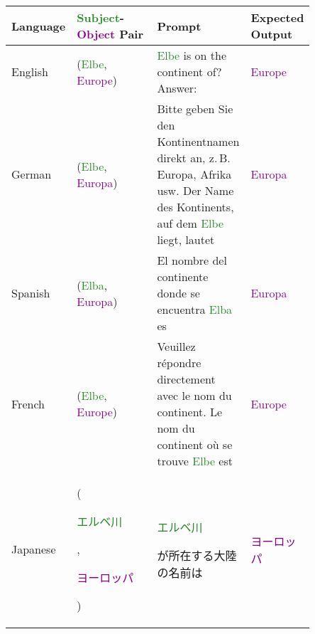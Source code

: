 \begin{table*}[htbp]
\scriptsize
\centering
\setlength{\tabcolsep}{1.0mm}{}
\begin{center}
\begin{tabular}{m{0.10\linewidth} p{0.30\linewidth} p{0.30\linewidth} m{0.15\linewidth}}
\textbf{Language} & \textbf{\textcolor{forestgreen}{Subject}-\textcolor{darkmagenta}{Object} Pair} & \textbf{Prompt} & \textbf{Expected Output} \\
\toprule
{\centering English} 
    & {\raggedright (\textcolor{forestgreen}{Elbe}, \textcolor{darkmagenta}{Europe})}
    & \textcolor{forestgreen}{Elbe} is on the continent of? \newline Answer:
    & {\centering \textcolor{darkmagenta}{Europe}} \\
\midrule
{\centering German} 
    & {\raggedright (\textcolor{forestgreen}{Elbe}, \textcolor{darkmagenta}{Europa})}
    & Bitte geben Sie den Kontinentnamen direkt an, z.\,B. Europa, Afrika usw. Der Name des Kontinents, auf dem \textcolor{forestgreen}{Elbe} liegt, lautet
    & {\centering \textcolor{darkmagenta}{Europa}} \\
\midrule
{\centering Spanish} 
    & {\raggedright (\textcolor{forestgreen}{Elba}, \textcolor{darkmagenta}{Europa})}
    & El nombre del continente donde se encuentra \textcolor{forestgreen}{Elba} es
    & {\centering \textcolor{darkmagenta}{Europa}} \\
\midrule
{\centering French} 
    & {\raggedright (\textcolor{forestgreen}{Elbe}, \textcolor{darkmagenta}{Europe})}
    & Veuillez répondre directement avec le nom du continent. Le nom du continent où se trouve \textcolor{forestgreen}{Elbe} est
    & {\centering \textcolor{darkmagenta}{Europe}} \\
\midrule
{\centering Japanese} 
    & {\raggedright (\textcolor{forestgreen}{\begin{CJK}{UTF8}{min}エルベ川\end{CJK}}, \textcolor{darkmagenta}{\begin{CJK}{UTF8}{min}ヨーロッパ\end{CJK}})}
    & \textcolor{forestgreen}{\begin{CJK}{UTF8}{min}エルベ川\end{CJK}}\begin{CJK}{UTF8}{min}が所在する大陸の名前は\end{CJK}
    & {\centering \textcolor{darkmagenta}{\begin{CJK}{UTF8}{min}ヨーロッパ\end{CJK}}} \\

\end{tabular}
\end{center}
\end{table*}
